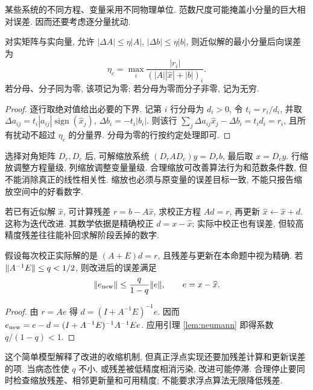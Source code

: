 某些系统的不同方程、变量采用不同物理单位. 范数尺度可能掩盖小分量的巨大相对误差. 因而还要考虑逐分量扰动.

\begin{proposition}\label{prop:componentwise}
对实矩阵与实向量, 允许 $|\Delta A|\le\eta|A|$, $|\Delta b|\le\eta|b|$, 则近似解的最小分量后向误差为
\[
\eta_c=\max_i\frac{|r_i|}{(|A||\widehat x|+|b|)_i}.
\]
若分母、分子同为零, 该项记为零; 若分母为零而分子非零, 记为无穷.
\end{proposition}
\begin{proof}
逐行取绝对值给出必要的下界. 记第 $i$ 行分母为 $d_i>0$, 令 $t_i=r_i/d_i$, 并取
$\Delta a_{ij}=t_i|a_{ij}|\operatorname{sign}(\widehat x_j)$,
$\Delta b_i=-t_i|b_i|$.
则该行 $\sum_j\Delta a_{ij}\widehat x_j-\Delta b_i=t_i d_i=r_i$, 且所有扰动不超过 $\eta_c$ 的分量界. 分母为零的行按约定处理即可.
\end{proof}
选择对角矩阵 $D_r,D_c$ 后, 可解缩放系统 $(D_rAD_c)y=D_rb$, 最后取 $x=D_cy$. 行缩放调整方程量级, 列缩放调整变量量级. 合理缩放可改善算法行为和范数条件数, 但不能消除真正的线性相关性. 缩放也必须与原变量的误差目标一致, 不能只报告缩放空间中的好看数字.

若已有近似解 $\widehat x$, 可计算残差 $r=b-A\widehat x$, 求校正方程 $Ad=r$, 再更新 $\widehat x\leftarrow\widehat x+d$. 这称为迭代改进. 其数学依据是精确校正 $d=x-\widehat x$; 实际中校正也有误差, 但较高精度残差往往能补回求解阶段丢掉的数字.

\begin{proposition}
假设每次校正实际解的是 $(A+E)d=r$, 且残差与更新在本命题中视为精确. 若 $\lVert A^{-1}E\rVert\le q<1/2$, 则改进后的误差满足
\[
\lVert e_{\rm new}\rVert\le\frac{q}{1-q}\lVert e\rVert,\qquad e=x-\widehat x.
\]
\end{proposition}
\begin{proof}
由 $r=Ae$ 得 $d=(I+A^{-1}E)^{-1}e$. 因而
$e_{\rm new}=e-d=(I+A^{-1}E)^{-1}A^{-1}Ee$.
应用引理 \ref{lem:neumann} 即得系数 $q/(1-q)<1$.
\end{proof}
这个简单模型解释了改进的收缩机制, 但真正浮点实现还要加残差计算和更新误差的项. 当病态性使 $q$ 不小, 或残差被低精度相消污染, 改进可能停滞. 合理停止要同时检查缩放残差、相邻更新量和可用精度; 不能要求浮点算法无限降低残差.

